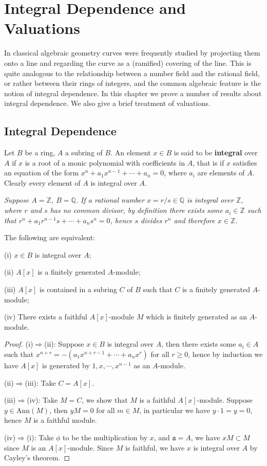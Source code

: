\section{Integral Dependence and Valuations}
In classical algebraic geometry curves were frequently studied by projecting them onto a line and regarding the curve as a (ramified) covering of the line. This is quite analogous to the relationship between a number field and the rational field, or rather between their rings of integers, and the common algebraic feature is the notion of integral dependence. In this chapter we prove a number of results about integral dependence. We also give a brief treatment of valuations.
\subsection{Integral Dependence}
Let $B$ be a ring, $A$ a subring of $B$. An element $x\in B$ is said to be \textbf{integral} over $A$ if $x$ is a root of a monic polynomial with coefficients in $A$, that is if $x$ satisfies an equation of the form $x^n+a_1x^{n-1}+\cdots+a_n=0$, where $a_i$ are elements of $A$. Clearly every element of $A$ is integral over $A$.
\begin{example}\em
Suppose $A=\mathbb{Z}$, $B=\mathbb{Q}$. If a rational number $x=r/s\in\mathbb{Q}$ is integral over $\mathbb{Z}$, where $r$ and $s$ has no common divisor, by definition there exists some $a_i\in\mathbb{Z}$ such that $r^n+a_1r^{n-1}s+\cdots +a_ns^n=0$, hence $s$ divides $r^n$ and therefore $x\in\mathbb{Z}$.
\end{example}
\begin{proposition}
The following are equivalent:\par
(i) $x\in B$ is integral over $A$;\par
(ii) $A[x]$ is a finitely generated $A$-module;\par
(iii) $A[x]$ is contained in a subring $C$ of $B$ such that $C$ is a finitely generated $A$-module;\par
(iv) There exists a faithful $A[x]$-module $M$ which is finitely generated as an $A$-module.
\end{proposition}
\begin{proof}
(i)$\Rightarrow$(ii): Suppose $x\in B$ is integral over $A$, then there exists some $a_i\in A$ such that $x^{n+r}=-(a_1x^{n+r-1}+\cdots+a_nx^r)$ for all $r\ge 0$, hence by induction we have $A[x]$ is generated by $1,x,\cdots,x^{n-1}$ as an $A$-module.\par
(ii)$\Rightarrow$(iii): Take $C=A[x]$.\par
(iii)$\Rightarrow$(iv): Take $M=C$, we show that $M$ is a faithful $A[x]$-module. Suppose $y\in\mathrm{Ann}(M)$, then $yM=0$ for all $m\in M$, in particular we have $y\cdot 1=y=0$, hence $M$ is a faithful module.\par
(iv)$\Rightarrow$(i): Take $\phi$ to be the multiplication by $x$, and $\mathfrak{a}=A$, we have $xM\subset M$ since $M$ is an $A[x]$-module. Since $M$ is faithful, we have $x$ is integral over $A$ by Cayley's theorem.
\end{proof}
